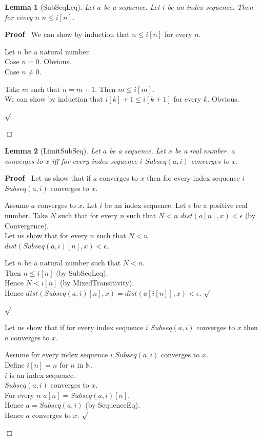 \documentclass{article}
\newenvironment{forthel}{\begin{leftbar}}{\end{leftbar}}
\newenvironment{proof}{\noindent\textbf{Proof\ }}{\hspace*{\fill}$\Box$\medskip}
\newenvironment{subproof}{\begin{list}{}{}
		\item[\text{Proof}]}{\hfill $\surd$ \end{list}}
\newenvironment{case}{\begin{list}{}{}
		\item[]}{\end{list}}
\newtheorem{lemma}{Lemma}
\newcommand{\NN}{\mathbb{N}}
\begin{document}
\begin{forthel}
	\begin{lemma}[SubSeqLeq]
		Let $a$ be a sequence. Let $i$ be an index sequence. Then for every $n$ $n \leq i[n]$.
	\end{lemma}
	
	\begin{proof}
		We can show by induction that $n \leq i[n]$ for every $n$.
		\begin{subproof}
			Let $n$ be a natural number.\\
			Case $n = 0$. Obvious.\\
			Case $n \neq 0$.
			\begin{case}
				Take $m$ such that $n = m + 1$. Then $m \leq i[m]$.\\
				We can show by induction that $i[k] + 1 \leq i[k + 1]$ for every $k$. Obvious.
			\end{case}
		\end{subproof}
	\end{proof}
	
	\begin{lemma}[LimitSubSeq]
		Let $a$ be a sequence. Let $x$ be a real number. $a$ converges to $x$ iff for every index sequence $i$ $Subseq(a,i)$ converges to $x$. 
	\end{lemma}
	\begin{proof}
		Let us show that if $a$ converges to $x$ then for every index sequence $i$ $Subseq(a,i)$ converges to $x$.
		
		\begin{subproof}
			Assume $a$ converges to $x$. 
			Let $i$ be an index sequence.
			Let $\epsilon$ be a positive real number.
			Take $N$ such that for every $n$ such that $N < n$ $dist(a[n],x) < \epsilon$ (by Convergence).
			\\Let us show that for every $n$ such that $N < n$ \\ $dist(Subseq(a,i)[n],x) < \epsilon$.
			\begin{subproof}
				Let $n$ be a natural number such that $N < n$.\\
				Then $n \leq i[n]$ (by SubSeqLeq).\\
				Hence $N < i[n]$ (by MixedTransitivity).\\
				Hence $dist(Subseq(a,i)[n],x) = dist(a[i[n]],x) < \epsilon$.
			\end{subproof}
		\end{subproof}
		Let us show that if for every index sequence $i$ $Subseq(a,i)$ converges to $x$ then $a$ converges to $x$.
		\begin{subproof}
			Assume for every index sequence $i$ $Subseq(a,i)$ converges to $x$. \\
			Define $i[n] = n$ for $n$ in $\NN$.\\
			$i$ is an index sequence.\\
			$Subseq(a,i)$ converges to $x$. \\
			For every $n$ $a[n] = Subseq(a,i)[n]$. \\
			Hence $a = Subseq(a,i)$ (by SequenceEq). \\
			Hence $a$ converges to $x$.
		\end{subproof}
	\end{proof}
	

\end{forthel}
\end{document}

